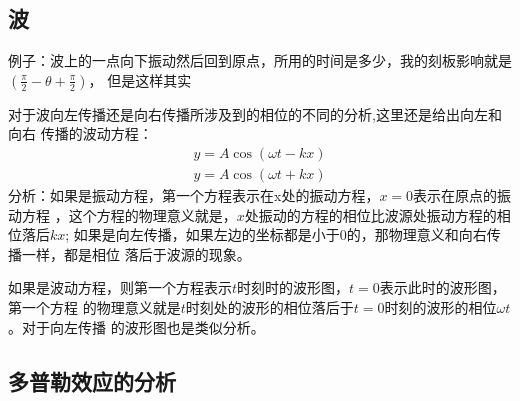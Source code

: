 \documentclass[UTF8]{article}
\begin{document}
\subsection{波}
例子：波上的一点向下振动然后回到原点，所用的时间是多少，我的刻板影响就是$(\frac{\pi}{2}-\theta+\frac{\pi}{2})$，
但是这样其实

对于波向左传播还是向右传播所涉及到的相位的不同的分析,这里还是给出向左和向右
传播的波动方程：
\begin{align*}
    y = A \cos (\omega t- kx)\\
    y = A\cos (\omega t +k x)
\end{align*}
分析：如果是振动方程，第一个方程表示在x处的振动方程，$x=0$表示在原点的振动方程
，这个方程的物理意义就是，$x$处振动的方程的相位比波源处振动方程的相位落后$kx$;
如果是向左传播，如果左边的坐标都是小于0的，那物理意义和向右传播一样，都是相位
落后于波源的现象。

如果是波动方程，则第一个方程表示$t$时刻时的波形图，$t=0$表示此时的波形图，第一个方程
的物理意义就是$t$时刻处的波形的相位落后于$t=0$时刻的波形的相位$\omega t$。对于向左传播
的波形图也是类似分析。
\subsection{多普勒效应的分析}
\end{document}
